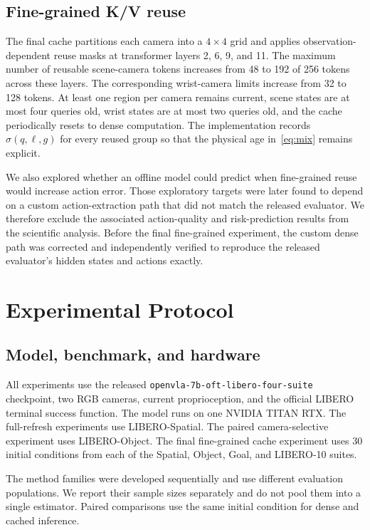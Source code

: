 \documentclass[journal]{IEEEtran}
\begin{document}
\subsection{Fine-grained K/V reuse}
The final cache partitions each camera into a $4\times4$ grid and applies observation-dependent reuse masks at transformer layers 2, 6, 9, and 11. The maximum number of reusable scene-camera tokens increases from 48 to 192 of 256 tokens across these layers. The corresponding wrist-camera limits increase from 32 to 128 tokens. At least one region per camera remains current, scene states are at most four queries old, wrist states are at most two queries old, and the cache periodically resets to dense computation. The implementation records $\sigma(q,\ell,g)$ for every reused group so that the physical age in~\eqref{eq:mix} remains explicit.

We also explored whether an offline model could predict when fine-grained reuse would increase action error. Those exploratory targets were later found to depend on a custom action-extraction path that did not match the released evaluator. We therefore exclude the associated action-quality and risk-prediction results from the scientific analysis. Before the final fine-grained experiment, the custom dense path was corrected and independently verified to reproduce the released evaluator's hidden states and actions exactly.

\section{Experimental Protocol}
\subsection{Model, benchmark, and hardware}
All experiments use the released \texttt{openvla-7b-oft-libero-four-suite} checkpoint, two RGB cameras, current proprioception, and the official LIBERO terminal success function. The model runs on one NVIDIA TITAN RTX. The full-refresh experiments use LIBERO-Spatial. The paired camera-selective experiment uses LIBERO-Object. The final fine-grained cache experiment uses 30 initial conditions from each of the Spatial, Object, Goal, and LIBERO-10 suites.

The method families were developed sequentially and use different evaluation populations. We report their sample sizes separately and do not pool them into a single estimator. Paired comparisons use the same initial condition for dense and cached inference.
\end{document}

